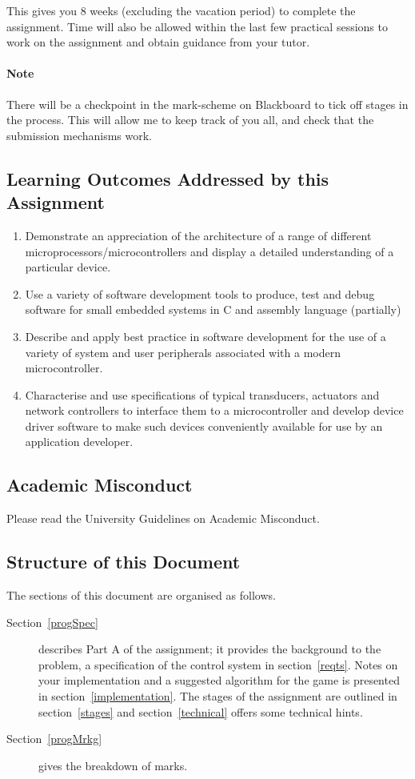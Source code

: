 \documentclass[a4paper]{article}
\begin{document}
This gives you 8 weeks (excluding the vacation period) to complete the
assignment.  Time will also be allowed within the last few practical
sessions to work on the assignment and obtain guidance from your
tutor.

\paragraph{Note}  There will be a checkpoint in the mark-scheme on
Blackboard to tick off stages in the process.  This will allow me to
keep track of you all, and check that the submission mechanisms work.

\clearpage
\subsection{Learning Outcomes Addressed by this Assignment}
\begin{enumerate}
\item Demonstrate an appreciation of the architecture of a range of
  different microprocessors/microcontrollers and display a detailed
  understanding of a particular device.
\item Use a variety of software development tools to produce, test and
  debug software for small embedded systems in C and assembly language
  (partially)
\item Describe and apply best practice in software development for the
  use of a variety of system and user peripherals associated with a
  modern microcontroller.
\item  Characterise and use specifications of typical
  transducers, actuators and network controllers to interface them to
  a microcontroller and develop device driver software to make such
  devices conveniently available for use by an application developer.
\end{enumerate}


\subsection{Academic Misconduct}
  Please
read the University Guidelines on Academic Misconduct.

\subsection{Structure of this Document}
The sections of this document are organised as follows.
\begin{description}
\item[Section~\ref{progSpec}] describes Part A of the assignment; it provides
the background to the problem, a specification of the control system
in section~\ref{reqts}.  Notes on your implementation and a suggested
algorithm for the game is presented in section~\ref{implementation}.
The stages of the assignment are outlined in section~\ref{stages} and
section~\ref{technical} offers some technical hints.
\item[Section~\ref{progMrkg}] gives the breakdown of marks.

\end{description}
\end{document}
